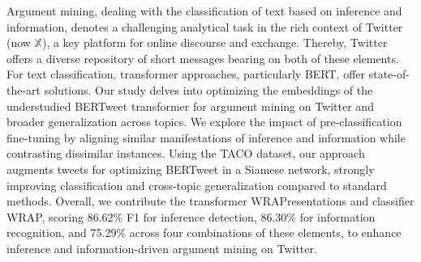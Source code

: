 Argument mining, dealing with the classification of text based on inference and information, denotes a challenging analytical task in the rich context of Twitter (now $\mathbb{X}$), a key platform for online discourse and exchange. Thereby, Twitter offers a diverse repository of short messages bearing on both of these elements. For text classification, transformer approaches, particularly BERT, offer state-of-the-art solutions. Our study delves into optimizing the embeddings of the understudied BERTweet transformer for argument mining on Twitter and broader generalization across topics. We explore the impact of pre-classification fine-tuning by aligning similar manifestations of inference and information while contrasting dissimilar instances. Using the TACO dataset, our approach augments tweets for optimizing BERTweet in a Siamese network, strongly improving classification and cross-topic generalization compared to standard methods. Overall, we contribute the transformer WRAPresentations and classifier WRAP, scoring 86.62\% F1 for inference detection, 86.30\% for information recognition, and 75.29\% across four combinations of these elements, to enhance inference and information-driven argument mining on Twitter.